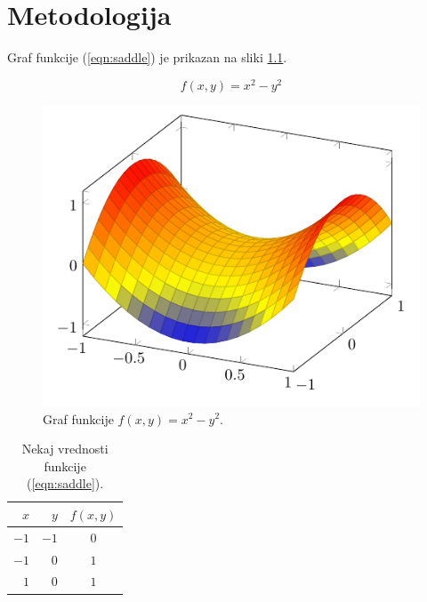 \chapter{Metodologija}

\noindent
Graf funkcije (\ref{eqn:saddle}) je prikazan na sliki \ref{fig:plot}.

\begin{equation}
    f(x, y) = x^2 - y^2
    \label{eqn:saddle}
\end{equation}

\begin{figure}[ht]
    \centering
    \includegraphics[width=0.6\linewidth]{images/plot.pdf}
    \caption{Graf funkcije $f(x, y) = x^2 - y^2$.}
    \label{fig:plot}
\end{figure}

\begin{table}[ht]
    \centering
    \caption{Nekaj vrednosti funkcije (\ref{eqn:saddle}).}
    \begin{tabular}{|rr|c|}
        \hline
        $x$  & $y$  & $f(x, y)$ \\
        \hline
        $-1$ & $-1$ & $0$ \\
        $-1$ & $0$  & $1$ \\
        $1$ & $0$   & $1$ \\
        \hline
    \end{tabular}
\end{table}